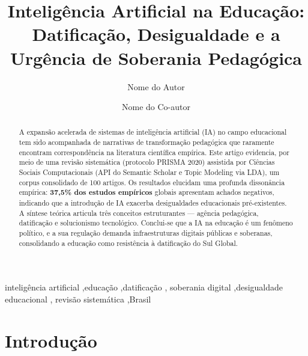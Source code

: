 \documentclass[preprint,12pt,authoryear]{elsarticle}
\begin{document}
\begin{frontmatter}

\title{Inteligência Artificial na Educação: Datificação,
       Desigualdade e a Urgência de Soberania Pedagógica}

\author[inst1]{Nome do Autor}
\author[inst2]{Nome do Co-autor}


\begin{abstract}
A expansão acelerada de sistemas de inteligência artificial (IA) no
campo educacional tem sido acompanhada de narrativas de transformação
pedagógica que raramente encontram correspondência na literatura
científica empírica.
Este artigo evidencia, por meio de uma revisão sistemática
(protocolo PRISMA 2020) assistida por Ciências Sociais Computacionais 
(API do Semantic Scholar e Topic Modeling via LDA), um corpus consolidado de 100 artigos.
Os resultados elucidam uma profunda dissonância empírica: \textbf{37,5\% dos estudos empíricos}
globais apresentam achados negativos, indicando que a introdução de IA exacerba
desigualdades educacionais pré-existentes. A síntese teórica articula três conceitos estruturantes ---
agência pedagógica, datificação e solucionismo tecnológico.
Conclui-se que a IA na educação é um fenômeno político, e a sua regulação 
demanda infraestruturas digitais públicas e soberanas, consolidando a educação
como resistência à datificação do Sul Global.
\end{abstract}

\begin{keyword}
inteligência artificial \sep educação \sep datificação \sep
soberania digital \sep desigualdade educacional \sep
revisão sistemática \sep Brasil
\end{keyword}

\end{frontmatter}

\section{Introdução}
\end{document}
